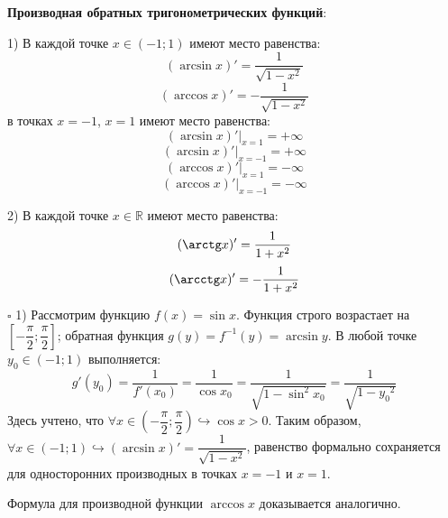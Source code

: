 \documentclass[12pt, a4paper, reqno]{article}
\begin{document}
    \textbf{Производная обратных тригонометрических функций}:

    1) В каждой точке $x\in(-1; 1)$ имеют место равенства:
    \begin{equation*}
        (\arcsin x)' = \dfrac{1}{\sqrt{1 - x^2}}
    \end{equation*}
    \begin{equation*}
        (\arccos x)' = -\dfrac{1}{\sqrt{1 - x^2}}
    \end{equation*}
    в точках $x = -1$, $x = 1$ имеют место равенства:
    \begin{equation*}
        (\arcsin{x})'|_{x = 1} = +\infty
    \end{equation*}
    \begin{equation*}
        (\arcsin{x})'|_{x = -1} = +\infty
    \end{equation*}
    \begin{equation*}
        (\arccos{x})'|_{x = 1} = -\infty
    \end{equation*}
    \begin{equation*}
        (\arccos{x})'|_{x = -1} = -\infty
    \end{equation*}

    2) В каждой точке $x\in\mathbb{R}$ имеют место равенства:
    \begin{equation*}
        (\arctg x)' = \dfrac{1}{1 + x^2}
    \end{equation*}
    \begin{equation*}
        (\arcctg x)' = -\dfrac{1}{1 + x^2}
    \end{equation*}

    $\square$ 1) Рассмотрим функцию $f(x) = \sin{x}$. Функция строго возрастает на
    $\left[-\dfrac{\pi}{2}; \dfrac{\pi}{2}\right]$; обратная функция $g(y) = f^{-1}(y) = \arcsin{y}$. В любой
    точке $y_0\in(-1; 1)$ выполняется:
    \begin{equation*}
        g'(y_0) = \dfrac{1}{f'(x_0)} = \dfrac{1}{\cos{x_0}} = \dfrac{1}{\sqrt{1 - \sin^2{x_0}}} =
        \dfrac{1}{\sqrt{1 - {y_0}^2}}
    \end{equation*}
    Здесь учтено, что $\forall x\in\left(-\dfrac{\pi}{2}; \dfrac{\pi}{2}\right)\hookrightarrow
    \cos{x} > 0$. Таким образом, $\forall x\in(-1; 1)\hookrightarrow (\arcsin{x})' =
    \dfrac{1}{\sqrt{1 - x^2}}$, равенство формально сохраняется для односторонних производных в
    точках $x = -1$ и $x = 1$.

    Формула для производной функции $\arccos{x}$ доказывается аналогично.
\end{document}
